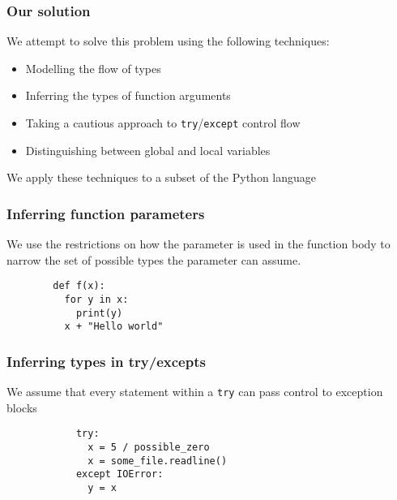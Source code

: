 \documentclass{beamer}
\begin{document}
  \begin{frame}
    \frametitle{Our solution}
    We attempt to solve this problem using the following techniques: \\
    \begin{itemize}
        \item Modelling the flow of types
    		\item Inferring the types of function arguments
    		\item Taking a cautious approach to \texttt{try}/\texttt{except} control flow
    		\item Distinguishing between global and local variables
    \end{itemize}
    We apply these techniques to a subset of the Python language
  \end{frame}


\begin{frame}[fragile]
    \frametitle{Inferring function parameters}
    \begin{block}{}
    We use the restrictions on how the parameter is used in the function body to narrow the set of possible types the parameter can assume.
    \end{block}
    
    \begin{block}{}
    \begin{lstlisting}
        def f(x):
          for y in x:
            print(y)
          x + "Hello world"
    \end{lstlisting}
    \end{block}
\end{frame}
 
  
\begin{frame}[fragile]
    \frametitle{Inferring types in try/excepts}
    We assume that every statement within a \texttt{try} can pass control to exception blocks
    \begin{block}{}
    \begin{lstlisting}
        	try:
        	  x = 5 / possible_zero
        	  x = some_file.readline()
        	except IOError:
        	  y = x
    \end{lstlisting}
    \end{block}
\end{frame}
\end{document}
